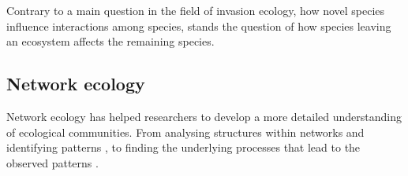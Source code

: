 \documentclass[12pt,a4paper]{article}
\begin{document}
Contrary to a main question in the field of invasion ecology, how novel species influence interactions among species, stands the question of how species leaving an ecosystem affects the remaining species. 


%
\subsection{Network ecology}
Network ecology has helped researchers to develop a more detailed understanding of ecological communities. From analysing structures within networks and identifying patterns \parencite{Jordano1987, Dunne2002 }, %
to finding the underlying processes that lead to the observed patterns \parencite{Rezende2007, Vazquez2009, Thebault2010}.

\end{document}
